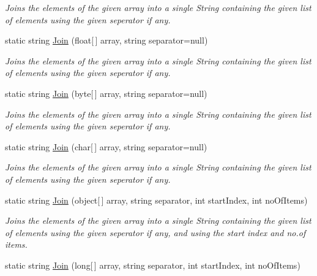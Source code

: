 \begin{DoxyCompactItemize}
\begin{DoxyCompactList}\small\item\em Joins the elements of the given array into a single String containing the given list of elements using the given seperator if any. \end{DoxyCompactList}\item 
static string \hyperlink{class_ultimate_1_1_utilities_1_1_string_utils_a33f623a2262207c1690f0d6dc9a82a7d}{Join} (float\mbox{[}$\,$\mbox{]} array, string separator=null)
\begin{DoxyCompactList}\small\item\em Joins the elements of the given array into a single String containing the given list of elements using the given seperator if any. \end{DoxyCompactList}\item 
static string \hyperlink{class_ultimate_1_1_utilities_1_1_string_utils_a8ff64a81cbc7c2947dc2605387d89a5c}{Join} (byte\mbox{[}$\,$\mbox{]} array, string separator=null)
\begin{DoxyCompactList}\small\item\em Joins the elements of the given array into a single String containing the given list of elements using the given seperator if any. \end{DoxyCompactList}\item 
static string \hyperlink{class_ultimate_1_1_utilities_1_1_string_utils_ad609aaec5e0de60c50594980e5a31410}{Join} (char\mbox{[}$\,$\mbox{]} array, string separator=null)
\begin{DoxyCompactList}\small\item\em Joins the elements of the given array into a single String containing the given list of elements using the given seperator if any. \end{DoxyCompactList}\item 
static string \hyperlink{class_ultimate_1_1_utilities_1_1_string_utils_a0e4a9e01791f59415419a41b4970e1c4}{Join} (object\mbox{[}$\,$\mbox{]} array, string separator, int start\+Index, int no\+Of\+Items)
\begin{DoxyCompactList}\small\item\em Joins the elements of the given array into a single String containing the given list of elements using the given seperator if any, and using the start index and no.\+of items. \end{DoxyCompactList}\item 
static string \hyperlink{class_ultimate_1_1_utilities_1_1_string_utils_a6fadb9f40bb03281fe4fdf808c698cda}{Join} (long\mbox{[}$\,$\mbox{]} array, string separator, int start\+Index, int no\+Of\+Items)

\end{DoxyCompactItemize}
